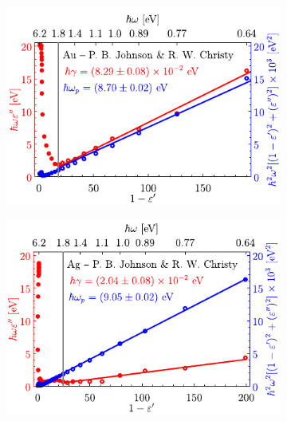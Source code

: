 	\begin{figure}[h!]\centering\hspace*{-1.5em}
	\begin{subfigure}{.01\linewidth}\caption{}\label{sfig:FitDrudeAu}\vspace{3.75cm}\end{subfigure}
	\begin{subfigure}{.45\linewidth}\hspace*{-1.3em}
	\includegraphics[scale=1]{1-Teoria/figs/1-4-DrudeFit_Au.pdf}
	\end{subfigure}
	\begin{subfigure}{.01\linewidth}\caption{}\label{sfig:FitDrudeAg}\vspace{3.75cm}\end{subfigure}
	\begin{subfigure}{.45\linewidth}\hspace*{-1em}
	\includegraphics[scale=1]{1-Teoria/figs/1-4-DrudeFit_Ag.pdf}

\end{subfigure}
\end{figure}
